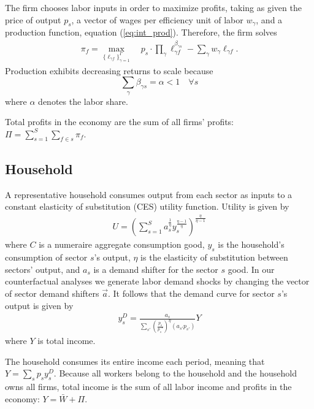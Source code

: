 \documentclass[12pt]{article}
\def\g{\gamma}
\theoremstyle{definition}
\theoremstyle{plain}
\begin{document}
% 

The firm chooses labor inputs in order to maximize profits, taking as given the price of output $p_s$, a vector of wages per efficiency unit of labor $w_{\g}$, and a production function, equation (\ref{eq:int_prod}). Therefore, the firm solves
\begin{align}
	\pi_f = \max_{ \{ \ell_{\g f} \}_{\g=1}^{\Gamma} } \quad  p_s \cdot   \prod_{\g} \ell_{\g f}^{\beta_{\g s}}  - \sum_{\g} w_{\g} \ell_{\g f} . \label{eq:int_profit_max}
\end{align}
Production exhibits decreasing returns to scale because
\[ \sum_{\g} \beta_{\g s} =\alpha < 1 \quad \forall s \]
where $\alpha$ denotes the labor share. 

Total profits in the economy are the sum of all firms' profits: $\Pi = \sum_{s=1}^S \sum_{f \in s} \pi_f$.


\subsection{Household}

A representative household consumes output from each sector as inputs to a constant elasticity of substitution (CES) utility function. Utility is given by
\begin{align}
	U =\left ( \sum_{s=1}^S a_s^\frac{1}{\eta} y_s^{\frac{\eta-1}{\eta}} \right )^{\frac{\eta}{\eta-1}} \label{eq:utility}
\end{align}
where $C$ is a numeraire aggregate consumption good, $y_s$ is the household's consumption of sector $s$'s output, $\eta$ is the elasticity of substitution between sectors' output, and $a_s$ is a demand shifter for the sector $s$ good. In our counterfactual analyses we generate labor demand shocks by changing the vector of sector demand shifters $\vec{a}$.  It follows that the demand curve for sector $s$'s output is given by 
\begin{align}
	y_s^D =  \frac{ a_s }{ \sum_{s'} \left(\frac{p_s}{p_s'}\right)^{\eta} \left(a_{s'} p_{s'}\right)}Y \label{eq:consumer_demand} %
\end{align}
where $Y$ is total income.

The household consumes its entire income each period, meaning that $Y= \sum_{s} p_s y_s^D$. Because all workers belong to the household and the household owns all firms, total income is the sum of all labor income and profits in the economy: $Y = \bar W + \Pi$.
\end{document}
